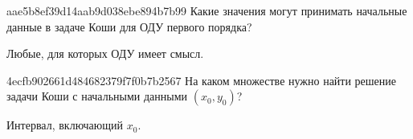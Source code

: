 \begin{note}{aae5b8ef39d14aab9d038ebe894b7b99}
    Какие значения могут принимать начальные данные в задаче Коши для ОДУ первого порядка?

    \begin{cloze}{1}
        Любые, для которых ОДУ имеет смысл.
    \end{cloze}
\end{note}

\begin{note}{4ecfb902661d484682379f7f0b7b2567}
    На каком множестве нужно найти решение задачи Коши с начальными данными \({ (x_0, y_0) }\)?

    \begin{cloze}{1}
        Интервал, включающий \({ x_0 }\).
    \end{cloze}
\end{note}



